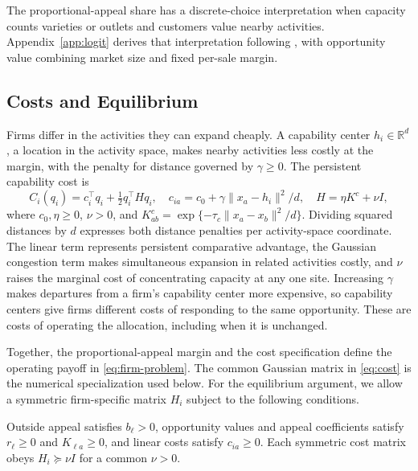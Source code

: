 The proportional-appeal share has a discrete-choice interpretation when
capacity counts varieties or outlets and customers value nearby activities.
Appendix~\ref{app:logit} derives that interpretation following
\citet{train_discrete_choice_2009}, with opportunity value
combining market size and fixed per-sale margin.

\subsection{Costs and Equilibrium}\label{sec:model-equilibrium}

Firms differ in the activities they can expand cheaply.
A capability center $h_i\in\mathbb R^d$, a location in the activity space,
makes nearby activities less costly at the margin,
with the penalty for distance governed by $\gamma\geq0$.
The persistent capability cost is
\begin{equation}\label{eq:cost}
  C_i(q_i)=c_i^\top q_i+\tfrac12q_i^\top Hq_i,
  \quad c_{ia}=c_0+\gamma\|x_a-h_i\|^2/d,
  \quad H=\eta K^c+\nu I,
\end{equation}
where $c_0,\eta\geq0$, $\nu>0$, and $K^c_{ab}=\exp\{-\tau_c\|x_a-x_b\|^2/d\}$.
Dividing squared distances by $d$ expresses both distance penalties per
activity-space coordinate.
The linear term represents persistent comparative advantage, the Gaussian
congestion term makes simultaneous expansion in related activities costly,
and $\nu$ raises the marginal cost of concentrating capacity at any one site.
Increasing $\gamma$ makes departures from a firm's capability center more
expensive, so capability centers give firms different costs of responding to
the same opportunity.
These are costs of operating the allocation, including when it is unchanged.

Together, the proportional-appeal margin and the cost specification define
the operating payoff in \eqref{eq:firm-problem}.
The common Gaussian matrix in \eqref{eq:cost} is the numerical specialization
used below.
For the equilibrium argument, we allow a symmetric firm-specific matrix $H_i$
subject to the following conditions.

\begin{assumption}\label{ass:primitives}
  Outside appeal satisfies $b_\ell>0$, opportunity values and appeal
  coefficients
  satisfy $r_\ell\geq0$ and $K_{\ell a}\geq0$, and linear costs
  satisfy $c_{ia}\geq0$.
  Each symmetric cost matrix obeys $H_i\succeq\nu I$ for a common $\nu>0$.
\end{assumption}

